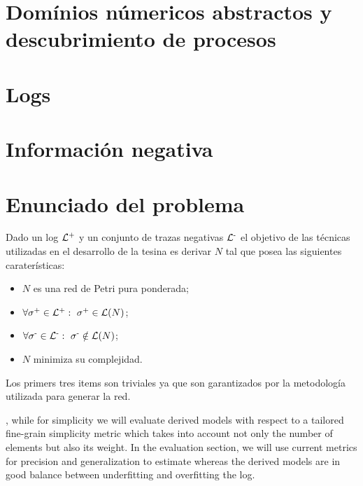 \section{Domínios númericos abstractos y descubrimiento de procesos} 
\label{sec:2.discovery}

\section{Logs} 
\label{sec:2.logs}

\section{Información negativa} 
\label{sec:2.negative}

\section{Enunciado del problema} 
\label{sec:2.problem}

Dado un log ${\mathcal L}\textsuperscript{+}$ y un conjunto de trazas negativas ${\mathcal L}\textsuperscript{-}$ el objetivo de las técnicas utilizadas 
en el desarrollo de la tesina es derivar $N$ tal que posea las siguientes caraterísticas:\\

\begin{itemize}
 \item $N$ es una red de Petri pura ponderada;
 \item $\forall \sigma\textsuperscript{+} \in {\mathcal L}\textsuperscript{+}:~ \sigma\textsuperscript{+} \in \mathcal{L}(N)$;
 \item $\forall \sigma\textsuperscript{-} \in {\mathcal L}\textsuperscript{-}:~ \sigma\textsuperscript{-} \notin \mathcal{L}(N)$;
 \item $N$ minimiza su complejidad. 
\end{itemize}

Los primers tres items son triviales ya que son garantizados por la metodología utilizada
para generar la red.

, while for simplicity we will evaluate derived models with respect to a tailored fine-grain simplicity metric
which takes into account not only the number of elements but also its weight. In the evaluation section, we will use current metrics for precision and
generalization to estimate whereas the derived models are in good balance between underfitting and overfitting the log.

